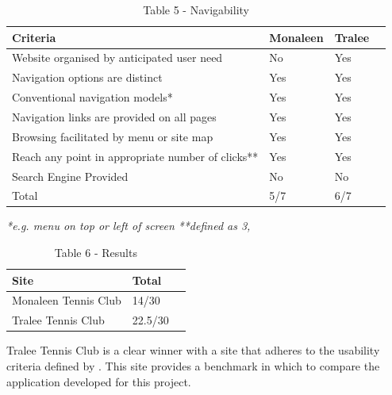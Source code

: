 \begin{table}[H]
\caption{Table 5 - Navigability}
\begin{center}
    \begin{tabular}{ | l | l | l | p{5cm} |}
    \hline
	\textbf{Criteria} & \textbf{Monaleen} & \textbf{Tralee}\\ \hline
	Website organised by anticipated user need & No & Yes\\ \hline
	Navigation options are distinct& Yes & Yes\\ \hline
	Conventional navigation models*& Yes & Yes\\ \hline
	Navigation links are provided on all pages & Yes & Yes\\ \hline
	Browsing facilitated by menu or site map &Yes & Yes\\ \hline
	Reach any point in appropriate number of clicks** & Yes & Yes\\ \hline
	Search Engine Provided & No & No\\ \hline
	Total & 5/7 & 6/7\\ \hline	
    \end{tabular}
\end{center}
\label{fig:table5}
\end{table}
\textit{*e.g. menu on top or left of screen}\newline
\textit{**defined as 3,} \cite{smith2001applying}

\begin{table}[H]
\caption{Table 6 - Results}
\begin{center}
    \begin{tabular}{ | l | l | p{5cm} |}
    \hline
	Site & Total\\ \hline
	Monaleen Tennis Club & 14/30\\ \hline
	Tralee Tennis Club & 22.5/30\\ \hline	
    \end{tabular}
\end{center}
\label{fig:table6}
\end{table}

Tralee Tennis Club is a clear winner with a site that adheres to the usability criteria defined by \cite{smith2001applying}. This site provides a benchmark in which to compare the application developed for this project.